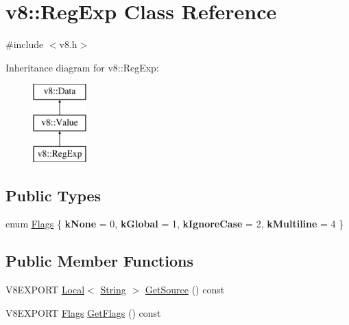\hypertarget{classv8_1_1_reg_exp}{}\section{v8\+:\+:Reg\+Exp Class Reference}
\label{classv8_1_1_reg_exp}


{\ttfamily \#include $<$v8.\+h$>$}

Inheritance diagram for v8\+:\+:Reg\+Exp\+:\begin{figure}[H]
\begin{center}
\leavevmode
\includegraphics[height=3.000000cm]{classv8_1_1_reg_exp}
\end{center}
\end{figure}
\subsection*{Public Types}
\begin{DoxyCompactItemize}
\item 
enum \hyperlink{classv8_1_1_reg_exp_aa4718a5c1f18472aff3bf51ed694fc5a}{Flags} \{ {\bfseries k\+None} = 0, 
{\bfseries k\+Global} = 1, 
{\bfseries k\+Ignore\+Case} = 2, 
{\bfseries k\+Multiline} = 4
 \}
\end{DoxyCompactItemize}
\subsection*{Public Member Functions}
\begin{DoxyCompactItemize}
\item 
V8\+E\+X\+P\+O\+R\+T \hyperlink{classv8_1_1_local}{Local}$<$ \hyperlink{classv8_1_1_string}{String} $>$ \hyperlink{classv8_1_1_reg_exp_aaaaa82b4490fe1eb0d470370293e770e}{Get\+Source} () const 
\item 
V8\+E\+X\+P\+O\+R\+T \hyperlink{classv8_1_1_reg_exp_aa4718a5c1f18472aff3bf51ed694fc5a}{Flags} \hyperlink{classv8_1_1_reg_exp_a02c7a85155ff5d2883ffc699e36ada4c}{Get\+Flags} () const 
\end{DoxyCompactItemize}
